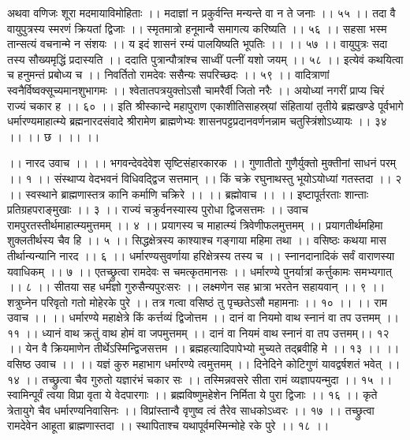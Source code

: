 अथवा वणिजः शूरा मदमायाविमोहिताः ।।
मदाज्ञां न प्रकुर्वन्ति मन्यन्ते वा न ते जनाः ।। ५५ ।।
तदा वै वायुपुत्रस्य स्मरणं क्रियतां द्विजाः ।।
स्मृतमात्रो हनूमान्वै समागत्य करिष्यति ।। ५६ ।।
सहसा भस्म तान्सत्यं वचनान्मे न संशयः ।।
य इदं शासनं रम्यं पालयिष्यति भूपतिः ।। ।। ५७ ।।
वायुपुत्रः सदा तस्य सौख्यमृद्धिं प्रदास्यति ।।
ददाति पुत्रान्पौत्रांश्च साध्वीं पत्नीं यशो जयम् ।। ५८ ।।
इत्येवं कथयित्वा च हनुमन्तं प्रबोध्य च ।।
निवर्तितो रामदेवः ससैन्यः सपरिच्छदः ।। ५९ ।।
वादित्राणां स्वनैर्विष्वक्सूच्यमानशुभागमः ।।
श्वेतातपत्रयुक्तोऽसौ चामरैर्वी जितो नरैः ।।
अयोध्यां नगरीं प्राप्य चिरं राज्यं चकार ह ।। ६० ।।
इति श्रीस्कान्दे महापुराण एकाशीतिसाहस्र्यां संहितायां तृतीये ब्रह्मखण्डे पूर्वभागे धर्मारण्यमाहात्म्ये ब्रह्मनारदसंवादे श्रीरामेण ब्राह्मणेभ्यः शासनपट्टप्रदानवर्णनन्नाम चतुस्त्रिंशोऽध्यायः ।। ३४ ।। ।। छ । ।। ।।

।। नारद उवाच ।। ।।
भगवन्देवदेवेश सृष्टिसंहारकारक ।।
गुणातीतो गुणैर्युक्तो मुक्तीनां साधनं परम् ।। १ ।।
संस्थाप्य वेदभवनं विधिवद्द्विज सत्तमान् ।।
किं चक्रे रघुनाथस्तु भूयोऽयोध्यां गतस्तदा ।। २ ।।
स्वस्थाने ब्राह्मणास्तत्र कानि कर्माणि चक्रिरे ।।
।। ब्रह्मोवाच ।। ।।
इष्टापूर्तरताः शान्ताः प्रतिग्रहपराङ्मुखाः ।। ३ ।।
राज्यं चक्रुर्वनस्यास्य पुरोधा द्विजसत्तमः ।।
उवाच रामपुरतस्तीर्थमाहात्म्यमुत्तमम् ।। ४ ।।
प्रयागस्य च माहात्म्यं त्रिवेणीफलमुत्तमम् ।।
प्रयागतीर्थमहिमा शुक्लतीर्थस्य चैव हि ।। ५ ।।
सिद्धक्षेत्रस्य काश्याश्च गङ्गाया महिमा तथा ।।
वसिष्ठः कथया मास तीर्थान्यन्यानि नारद ।। ६ ।।
धर्मारण्यसुवर्णाया हरिक्षेत्रस्य तस्य च ।।
स्नानदानादिकं सर्वं वाराणस्या यवाधिकम् ।। ७ ।।
एतच्छ्रुत्वा रामदेवः स चमत्कृतमानसः ।।
धर्मारण्ये पुनर्यात्रां कर्त्तुकामः समभ्यगात् ।। ८ ।।
सीतया सह धर्मज्ञो गुरुसैन्यपुरःसरः ।।
लक्ष्मणेन सह भ्रात्रा भरतेन सहायवान् ।। ९ ।।
शत्रुघ्नेन परिवृतो गतो मोहेरके पुरे ।।
तत्र गत्वा वसिष्ठं तु पृच्छतेऽसौ महामनाः ।। १० ।।
।। राम उवाच ।। ।।
धर्मारण्ये महाक्षेत्रे किं कर्त्तव्यं द्विजोत्तम ।।
दानं वा नियमो वाथ स्नानं वा तप उत्तमम् ।। ११ ।।
 ध्यानं वाथ क्रतुं वाथ होमं वा जपमुत्तमम् ।।
दानं वा नियमं वाथ स्नानं वा तप उत्तमम्।। १२ ।।
येन वै क्रियमाणेन तीर्थेऽस्मिन्द्विजसत्तम ।।
ब्रह्महत्यादिपापेभ्यो मुच्यते तद्ब्रवीहि मे ।। १३ ।।
।। वसिष्ठ उवाच ।। ।।
यज्ञं कुरु महाभाग धर्मारण्ये त्वमुत्तमम् ।।
दिनेदिने कोटिगुणं यावद्वर्षशतं भवेत् ।। १४ ।।
तच्छ्रुत्वा चैव गुरुतो यज्ञारंभं चकार सः ।।
तस्मिन्नवसरे सीता रामं व्यज्ञापयन्मुदा ।। १५ ।।
स्वामिन्पूर्वं त्वया विप्रा वृता ये वेदपारगाः ।।
ब्रह्मविष्णुमहेशेन निर्मिता ये पुरा द्विजाः ।। १६ ।।
कृते त्रेतायुगे चैव धर्मारण्यनिवासिनः ।।
विप्रांस्तान्वै वृणुष्व त्वं तैरेव साधकोऽध्वरः ।। १७ ।।
तच्छ्रुत्वा रामदेवेन आहूता ब्राह्मणास्तदा ।।
स्थापिताश्च यथापूर्वमस्मिन्मोहे रके पुरे ।। १८ ।।
